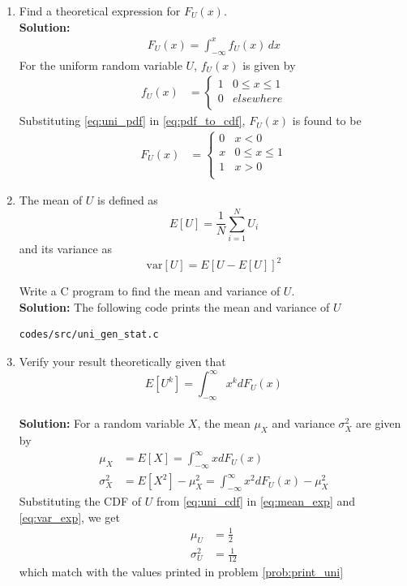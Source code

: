 \documentclass[journal,10pt,twocolumn]{article}
\providecommand{\sbrak}[1]{\ensuremath{{}\left[#1\right]}}
\newcommand{\solution}{\noindent \textbf{Solution: }}
\begin{document}
\begin{enumerate}
%
\item
Find a  theoretical expression for $F_{U}(x)$.\\
\solution
\begin{align} 
F_{U}(x) = \int_{-\infty}^{x} f_{U}(x)\,dx
\label{eq:pdf_to_cdf}
\end{align}
For the uniform random variable $U$, $f_{U}(x)$ is given by  
\begin{align}
	f_U(x) &= 
	\begin{cases}
	1 &  0 \le x \le  1
	\\
	0 & elsewhere
	\\
	\end{cases}
	\label{eq:uni_pdf}
\end{align}
Substituting \eqref{eq:uni_pdf} in \eqref{eq:pdf_to_cdf}, $F_U(x)$ is found to be
\begin{align}
	F_U(x) &= 
	\begin{cases}
	0 & x < 0
	\\	
	x & 0 \le x \le  1
	\\
	1 & x > 0
	\\
	\end{cases}
	\label{eq:uni_cdf}
\end{align}

\item
\label{prob:print_uni}
The mean of $U$ is defined as
%
\begin{equation}
E\sbrak{U} = \frac{1}{N}\sum_{i=1}^{N}U_i
\end{equation}
%
and its variance as
%
\begin{equation}
\text{var}\sbrak{U} = E\sbrak{U- E\sbrak{U}}^2 
\end{equation}

Write a C program to  find the mean and variance of $U$.\\
\solution The following code prints the mean and variance of $U$
\begin{lstlisting}
codes/src/uni_gen_stat.c
\end{lstlisting}

\item Verify your result theoretically given that
%
\begin{equation}
E\sbrak{U^k} = \int_{-\infty}^{\infty}x^kdF_{U}(x)
\end{equation}\\
\solution For a random variable $X$, the mean $\mu_X$ and variance $\sigma_X^2$ are given by
\begin{align}
	\label{eq:mean_exp}
	\mu_X &= E\sbrak{X} = \int_{-\infty}^{\infty}xdF_{U}(x) \\
	\label{eq:var_exp}
	\sigma_X^2 &= E\sbrak{X^2} - \mu_X^2 = \int_{-\infty}^{\infty}x^2dF_{U}(x) - \mu_X^2
\end{align}  
Substituting the CDF of $U$ from \eqref{eq:uni_cdf} in \eqref{eq:mean_exp} and \eqref{eq:var_exp}, we get
\begin{align}
	\label{eq:mean_uni}
	\mu_U &= \frac{1}{2} \\
	\label{eq:var_uni}
	\sigma_U^2 &= \frac{1}{12}
\end{align}  
which match with the values printed in problem \ref{prob:print_uni}
\end{enumerate}
\end{document}

